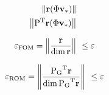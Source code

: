 \begin{align}
    \norm{\resid(\Phi \vunk_\ast)} \\
    \norm{\transpose{P}\resid(\Phi \vunk_\ast)}
\end{align}

\begin{equation}
    \varepsilon_\text{FOM} = \left\| \frac{\mathbf{r}}{\dim{\mathbf{r}}} \right\|_{~} \leq \varepsilon \\
\end{equation}

\begin{equation}
    \varepsilon_\text{ROM} = \norm{\frac{\transpose{\matr{P}_\text{G}}\resid}{\dim{ \transpose{\matr{P}_\text{G}}\resid}}} \leq \varepsilon
\end{equation}
